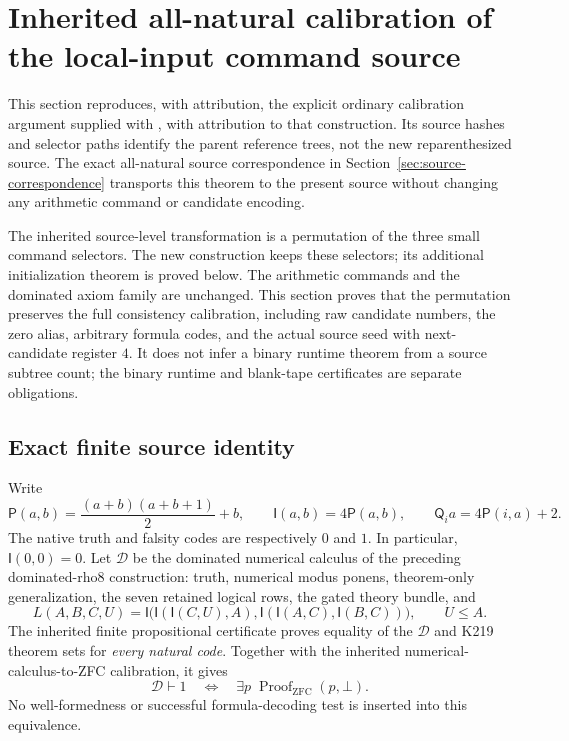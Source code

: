 \begingroup
\newcommand{\Kp}{\mathsf P}
\newcommand{\Ki}{\mathsf I}
\newcommand{\Kq}{\mathsf Q}
\newcommand{\Kd}{\mathcal D}
\newcommand{\Kax}{\mathsf{AX}}
\newcommand{\Kmp}{\mathsf{MP}}
\newcommand{\Kdrop}{\mathsf{DROP}}
\newcommand{\Knip}{\mathsf{NIP}}
\newcommand{\Kenc}{\operatorname{enc}}
\newcommand{\Kblk}{\mathcal B}
\newcommand{\Kdiscard}{\mathsf{Discard}}

\section{Inherited all-natural calibration of the local-input command source}
\label{sec:k216-source-calibration}

This section reproduces, with attribution, the explicit ordinary calibration argument supplied with , with attribution to that construction. Its source hashes and selector paths identify the parent reference trees, not the new reparenthesized source. The exact all-natural source correspondence in Section~\ref{sec:source-correspondence} transports this theorem to the present source without changing any arithmetic command or candidate encoding.

The inherited source-level transformation is a
permutation of the three small command selectors. The new construction keeps
these selectors; its additional initialization theorem is proved below. The arithmetic
commands and the dominated axiom family are unchanged. This section
proves that the permutation preserves the full consistency calibration,
including raw candidate numbers, the zero alias, arbitrary formula
codes, and the actual source seed with next-candidate register $4$.
It does not infer a binary runtime theorem from a source subtree count;
the binary runtime and blank-tape certificates are separate obligations.

\subsection{Exact finite source identity}

Write
\[
 \Kp(a,b)=\frac{(a+b)(a+b+1)}2+b,\qquad
 \Ki(a,b)=4\Kp(a,b),\qquad
 \Kq_i a=4\Kp(i,a)+2.
\]
The native truth and falsity codes are respectively $0$ and $1$.
In particular, $\Ki(0,0)=0$. Let $\Kd$ be the dominated numerical
calculus of the preceding dominated-rho8 construction: truth, numerical
modus ponens, theorem-only generalization, the seven retained logical
rows, the gated theory bundle, and
\[
 L(A,B,C,U)=
 \Ki\bigl(\Ki(\Ki(C,U),A),
            \Ki(\Ki(A,C),\Ki(B,C))\bigr),\qquad U\leq A.
\]
The inherited finite propositional certificate proves equality of the
$\Kd$ and K219 theorem sets for \emph{every natural code}. Together with
the inherited numerical-calculus-to-ZFC calibration, it gives
\begin{equation}
 \Kd\vdash1\quad\Longleftrightarrow\quad
 \exists p\;\operatorname{Proof}_{\mathrm{ZFC}}(p,\bot).
 \label{eq:k216-inherited-calibration}
\end{equation}
No well-formedness or successful formula-decoding test is inserted into
this equivalence.

